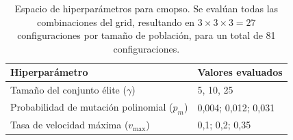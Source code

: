 \begin{table}[H]
\centering
\small
\caption{Espacio de hiperparámetros para \acrshort{cmopso}. Se evalúan todas las combinaciones del grid, resultando en $3 \times 3 \times 3 = 27$ configuraciones por tamaño de población, para un total de 81 configuraciones.}
\label{tab:hp_grid_cmopso}
\label{tab:hp_cmopso}
\begin{tabular}{ll}
\toprule
Hiperparámetro & Valores evaluados \\
\midrule
Tamaño del conjunto élite ($\gamma$) & 5, 10, 25 \\
Probabilidad de mutación polinomial ($p_m$) & 0,004; 0,012; 0,031 \\
Tasa de velocidad máxima ($v_{\text{max}}$) & 0,1; 0,2; 0,35 \\
\bottomrule
\end{tabular}
\end{table}
